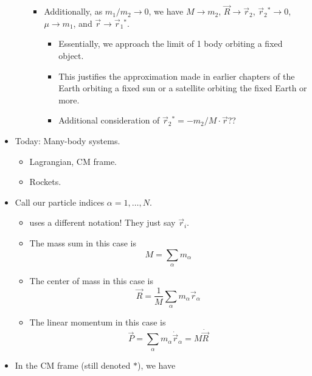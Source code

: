 \documentclass[../notes.tex]{subfiles}
\begin{document}
\begin{itemize}
\begin{itemize}
\begin{itemize}
            \item Additionally, as $m_1/m_2\to 0$, we have $M\to m_2$, $\vec{R}\to\vec{r}_2$, $\vec{r}_2{}^*\to 0$, $\mu\to m_1$, and $\vec{r}\to\vec{r}_1{}^*$.
            \begin{itemize}
                \item Essentially, we approach the limit of 1 body orbiting a fixed object.
                \item This justifies the approximation made in earlier chapters of the Earth orbiting a fixed sun or a satellite orbiting the fixed Earth or more.
                \item Additional consideration of $\vec{r}_2{}^*=-m_2/M\cdot\vec{r}$??
            \end{itemize}
        \end{itemize}
    \end{itemize}
    \item Today: Many-body systems.
    \begin{itemize}
        \item Lagrangian, CM frame.
        \item Rockets.
    \end{itemize}
    \item Call our particle indices $\alpha=1,\dots,N$.
    \begin{itemize}
        \item \textcite{bib:KibbleBerkshire} uses a different notation! They just say $\vec{r}_i$.
        \item The mass sum in this case is
        \begin{equation*}
            M = \sum_\alpha m_\alpha
        \end{equation*}
        \item The center of mass in this case is
        \begin{equation*}
            \vec{R} = \frac{1}{M}\sum_\alpha m_\alpha\vec{r}_\alpha
        \end{equation*}
        \item The linear momentum in this case is
        \begin{equation*}
            \vec{P} = \sum_\alpha m_\alpha\dot{\vec{r}}_\alpha
            = M\dot{\vec{R}}
        \end{equation*}
    \end{itemize}
    \item In the CM frame (still denoted $*$), we have
    \begin{equation*}

\end{equation*}
\end{itemize}
\end{document}
